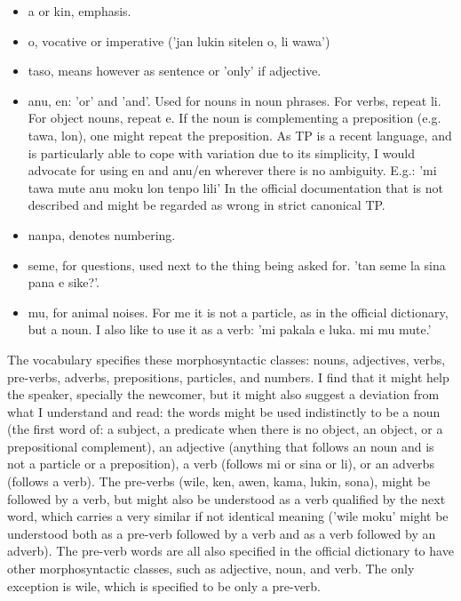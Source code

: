 \begin{itemize}
  \item a or kin, emphasis.
  \item o, vocative or imperative ('jan lukin sitelen o, li wawa')
  \item taso, means however as sentence or 'only' if adjective.
  \item anu, en: 'or' and 'and'. Used for nouns in noun phrases.
    For verbs, repeat li.
    For object nouns, repeat e.
    If the noun is complementing a preposition (e.g. tawa, lon),
    one might repeat the preposition.
    As TP is a recent language, and is particularly able to cope with
    variation due to its simplicity, I would advocate for
    using en and anu/en wherever there is no ambiguity.
    E.g.: 'mi tawa mute anu moku lon tenpo lili'
    In the official documentation that is not described and
    might be regarded as wrong in strict canonical TP.
  \item nanpa, denotes numbering.
  \item seme, for questions, used next to the thing being asked for.
    'tan seme la sina pana e sike?'.
  \item mu, for animal noises. For me it is not a particle, as in the
    official dictionary, but a noun.
    I also like to use it as a verb:
    'mi pakala e luka. mi mu mute.'
\end{itemize}

The vocabulary specifies these morphosyntactic classes:
nouns, adjectives, verbs, pre-verbs, adverbs, prepositions, particles, and numbers.
I find that it might help the speaker, specially the newcomer, but
it might also suggest a deviation from what I understand and read:
the words might be used indistinctly to be a noun
(the first word of: a subject, a predicate when there is no object, an object,
or a prepositional complement),
an adjective (anything that follows an noun and is not a particle or a
preposition),
a verb (follows mi or sina or li),
or an adverbs (follows a verb).
The pre-verbs (wile, ken, awen, kama, lukin, sona),
might be followed by a verb, but might also be understood
as a verb qualified by the next word,
which carries a very similar if not identical meaning
('wile moku' might be understood both as a pre-verb followed
by a verb and as a verb followed by an adverb).
The pre-verb words are all also specified in the official dictionary
to have other morphosyntactic classes,
such as adjective, noun, and verb.
The only exception is wile, which is specified to be only a pre-verb.


